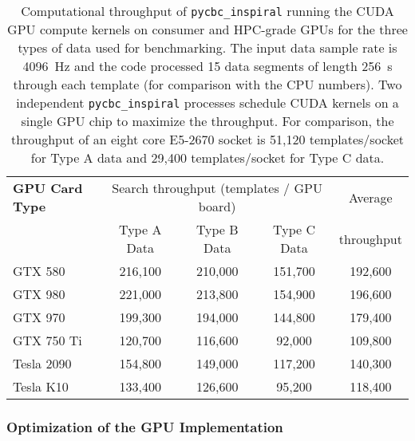 \begin{table}[!t]
\centering
{\small
\begin{tabular}{|l|c|c|c|c|}
\hline 
{\bf GPU Card Type}  & \multicolumn{3}{c|}{Search throughput (templates / GPU board)} & Average \\
                     & Type A Data & Type B Data & Type C Data & throughput \\\hline
GTX 580 & 216,100 & 210,000 & 151,700 & 192,600 \\
GTX 980 & 221,000 & 213,800 & 154,900 & 196,600 \\
GTX 970 & 199,300 & 194,000 & 144,800 & 179,400 \\
GTX 750 Ti & 120,700 & 116,600 & 92,000 & 109,800 \\
Tesla 2090 & 154,800 & 149,000 & 117,200 & 140,300 \\
Tesla K10 & 133,400 & 126,600 & 95,200 & 118,400 \\\hline
\end{tabular}
}
\caption{\label{tab:gpu-results}
Computational throughput of \texttt{pycbc\_inspiral} running the CUDA GPU
compute kernels on consumer and HPC-grade GPUs for the three types of data
used for benchmarking. The input data sample rate is 4096~Hz and the code
processed 15 data segments of length 256~s through each template (for
comparison with the CPU numbers). Two independent \texttt{pycbc\_inspiral}
processes schedule CUDA kernels on a single GPU chip to maximize the
throughput.  For comparison, the throughput of an eight core E5-2670 socket is
51,120 templates/socket for Type A data and 29,400 templates/socket for Type C
data.
}
\end{table}

\vspace*{-10pt}
\subsubsection{Optimization of the GPU Implementation}
\vspace*{-05pt}


